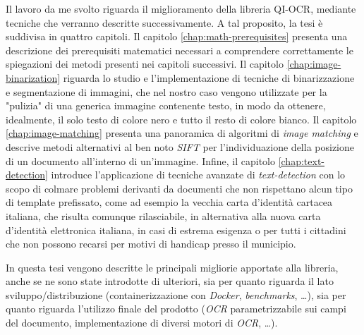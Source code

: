 Il lavoro da me svolto riguarda il miglioramento della libreria QI-OCR, mediante tecniche che verranno descritte successivamente. A tal proposito, la tesi \`e suddivisa in quattro capitoli. Il capitolo \ref{chap:math-prerequisites} presenta una descrizione dei prerequisiti matematici necessari a comprendere correttamente le spiegazioni dei metodi presenti nei capitoli successivi. Il capitolo \ref{chap:image-binarization} riguarda lo studio e l'implementazione di tecniche di binarizzazione e segmentazione di immagini, che nel nostro caso vengono utilizzate per la "pulizia" di una generica immagine contenente testo, in modo da ottenere, idealmente, il solo testo di colore nero e tutto il resto di colore bianco. Il capitolo \ref{chap:image-matching} presenta una panoramica di algoritmi di \textit{image matching} e descrive metodi alternativi al ben noto \textit{SIFT} per l'individuazione della posizione di un documento all'interno di un'immagine. Infine, il capitolo \ref{chap:text-detection} introduce l'applicazione di tecniche avanzate di \textit{text-detection} con lo scopo di colmare problemi derivanti da documenti che non rispettano alcun tipo di template prefissato, come ad esempio la vecchia carta d'identit\`a cartacea italiana, che risulta comunque rilasciabile, in alternativa alla nuova carta d'identit\`a elettronica italiana, in casi di estrema esigenza o per tutti i cittadini che non possono recarsi per motivi di handicap presso il municipio.\par 
In questa tesi vengono descritte le principali migliorie apportate alla libreria, anche se ne sono state introdotte di ulteriori, sia per quanto riguarda il lato sviluppo/distribuzione (containerizzazione con \textit{Docker}, \textit{benchmarks}, \dots), sia per quanto riguarda l'utilizzo finale del prodotto (\textit{OCR} parametrizzabile sui campi del documento, implementazione di diversi motori di \textit{OCR}, \dots).
